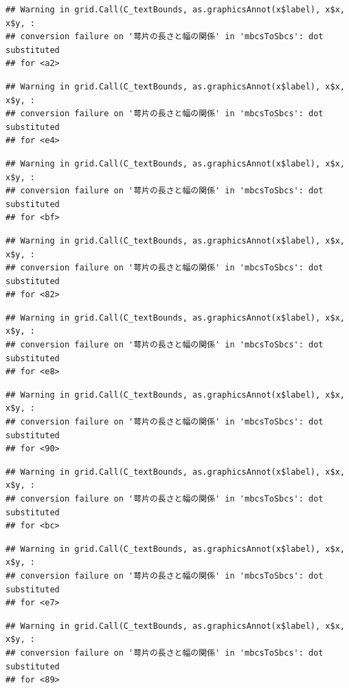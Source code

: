 \documentclass[
]{book}
\begin{document}
\begin{verbatim}
## Warning in grid.Call(C_textBounds, as.graphicsAnnot(x$label), x$x, x$y, :
## conversion failure on '萼片の長さと幅の関係' in 'mbcsToSbcs': dot substituted
## for <a2>
\end{verbatim}

\begin{verbatim}
## Warning in grid.Call(C_textBounds, as.graphicsAnnot(x$label), x$x, x$y, :
## conversion failure on '萼片の長さと幅の関係' in 'mbcsToSbcs': dot substituted
## for <e4>
\end{verbatim}

\begin{verbatim}
## Warning in grid.Call(C_textBounds, as.graphicsAnnot(x$label), x$x, x$y, :
## conversion failure on '萼片の長さと幅の関係' in 'mbcsToSbcs': dot substituted
## for <bf>
\end{verbatim}

\begin{verbatim}
## Warning in grid.Call(C_textBounds, as.graphicsAnnot(x$label), x$x, x$y, :
## conversion failure on '萼片の長さと幅の関係' in 'mbcsToSbcs': dot substituted
## for <82>
\end{verbatim}

\begin{verbatim}
## Warning in grid.Call(C_textBounds, as.graphicsAnnot(x$label), x$x, x$y, :
## conversion failure on '萼片の長さと幅の関係' in 'mbcsToSbcs': dot substituted
## for <e8>
\end{verbatim}

\begin{verbatim}
## Warning in grid.Call(C_textBounds, as.graphicsAnnot(x$label), x$x, x$y, :
## conversion failure on '萼片の長さと幅の関係' in 'mbcsToSbcs': dot substituted
## for <90>
\end{verbatim}

\begin{verbatim}
## Warning in grid.Call(C_textBounds, as.graphicsAnnot(x$label), x$x, x$y, :
## conversion failure on '萼片の長さと幅の関係' in 'mbcsToSbcs': dot substituted
## for <bc>
\end{verbatim}

\begin{verbatim}
## Warning in grid.Call(C_textBounds, as.graphicsAnnot(x$label), x$x, x$y, :
## conversion failure on '萼片の長さと幅の関係' in 'mbcsToSbcs': dot substituted
## for <e7>
\end{verbatim}

\begin{verbatim}
## Warning in grid.Call(C_textBounds, as.graphicsAnnot(x$label), x$x, x$y, :
## conversion failure on '萼片の長さと幅の関係' in 'mbcsToSbcs': dot substituted
## for <89>
\end{verbatim}
\end{document}
